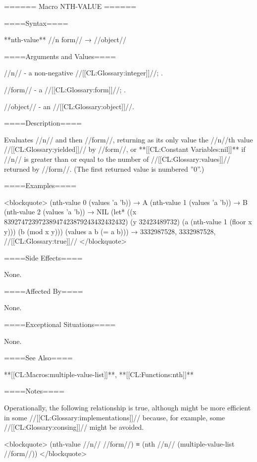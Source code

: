 ====== Macro NTH-VALUE ======

====Syntax====

**nth-value** //n form// → //object//

====Arguments and Values====

//n// - a non-negative //[[CL:Glossary:integer]]//; \eval.

//form// - a //[[CL:Glossary:form]]//; \evalspecial.

//object// - an //[[CL:Glossary:object]]//.

====Description====

Evaluates //n// and then //form//, returning as its only value the //n//th value //[[CL:Glossary:yielded]]// by //form//, or **[[CL:Constant Variables:nil]]** if //n// is greater than or equal to the number of //[[CL:Glossary:values]]// returned by //form//. (The first returned value is numbered ''0''.)

====Examples====

<blockquote> (nth-value 0 (values 'a 'b)) → A (nth-value 1 (values 'a 'b)) → B (nth-value 2 (values 'a 'b)) → NIL (let* ((x 83927472397238947423879243432432432) (y 32423489732) (a (nth-value 1 (floor x y))) (b (mod x y))) (values a b (= a b))) → 3332987528, 3332987528, //[[CL:Glossary:true]]// </blockquote>

====Side Effects====

None.

====Affected By====

None.

====Exceptional Situations====

None.

====See Also====

**[[CL:Macros:multiple-value-list]]**, **[[CL:Functions:nth]]**

====Notes====

Operationally, the following relationship is true, although  might be more efficient in some //[[CL:Glossary:implementations]]// because, for example, some //[[CL:Glossary:consing]]// might be avoided.

<blockquote> (nth-value //n// //form//) ≡ (nth //n// (multiple-value-list //form//)) </blockquote>

